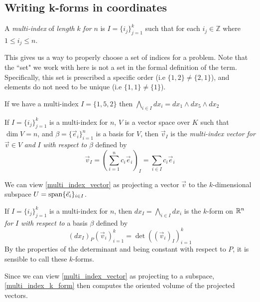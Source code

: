 \documentclass[notes]{subfiles}
\begin{document}
\subsection{Writing k-forms in coordinates}
\begin{definition}
    A \textit{multi-index} of \textit{length} $k$ \textit{for} $n$ is $I = \{i_j\}_{j = 1}^k$ such that for each $i_j \in \mathbb{Z}$ where $1 \leq i_j \leq n$.
\end{definition}
This gives us a way to properly choose a set of indices for a problem. Note that the ``set" we work with here is not a set in the formal definition of the term. Specifically, this set is prescribed a specific order (i.e $\{ 1, 2 \} \neq \{ 2, 1 \}$), and elements do not need to be unique (i.e $\{ 1, 1 \} \neq \{ 1 \}$).

\begin{example}
    If we have a multi-index $I = \{1, 5, 2\}$ then $\bigwedge_{i \in I} dx_i = dx_1 \wedge dx_5 \wedge dx_2$
\end{example}

\begin{definition} \label{multi_index_vector}
    If $I = \{ i_j \}_{j = 1}^k$ is a multi-index for $n$, $V$ is a vector space over $K$ such that $\dim V = n$, and $\beta = \{ \vec{e}_i \}_{i = 1}^n$ is a basis for $V$, then $\vec{v}_I$ is the \textit{multi-index vector for} $\vec{v} \in V$ \textit{and} $I$ \textit{with respect to} $\beta$ defined by
    \[
        \vec{v}_I = \left(\sum_{i = 1}^n c_i\vec{e}_i\right)_I
        = \sum_{i \in I} c_i\vec{e}_i
    \]
\end{definition}
We can view \cref{multi_index_vector} as projecting a vector $\vec{v}$ to the $k$-dimensional subspace $U = \operatorname{span} \{ \vec{e}_i \}_{i \in I}$.

\begin{definition} \label{multi_index_k_form}
    If $I = \{ i_j \}_{j = 1}^k$ is a multi-index for $n$, then $dx_I = \bigwedge_{i \in I} dx_i$ is the $k$-form on $\mathbb{R}^n$ \textit{for} $I$ \textit{with respect to} a basis $\beta$ defined by
    \[
        (dx_I)_P(\vec{v}_i)_{i = 1}^k
        = \det({(\vec{v}_i)_I})_{i = 1}^k
    \]
    By the properties of the determinant and being constant with respect to $P$, it is sensible to call these $k$-forms.
\end{definition}

Since we can view \cref{multi_index_vector} as projecting to a subspace, \cref{multi_index_k_form} then computes the oriented volume of the projected vectors.
\end{document}
